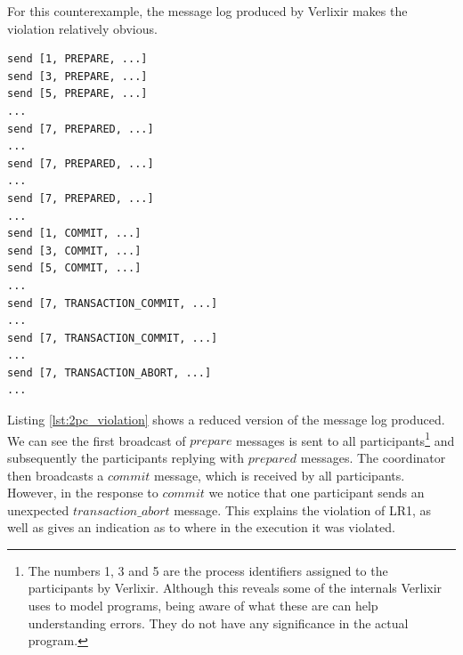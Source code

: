\par
For this counterexample, the message log produced by Verlixir makes the violation relatively obvious.
\begin{lstlisting}[xleftmargin=.01\linewidth, xrightmargin=0.01\linewidth, caption={Message log produced by counterexample violating LR1.}, label={lst:2pc_violation}]
send [1, PREPARE, ...]
send [3, PREPARE, ...]
send [5, PREPARE, ...]
...
send [7, PREPARED, ...]
...
send [7, PREPARED, ...]
...
send [7, PREPARED, ...]
...
send [1, COMMIT, ...]
send [3, COMMIT, ...]
send [5, COMMIT, ...]
...
send [7, TRANSACTION_COMMIT, ...]
...
send [7, TRANSACTION_COMMIT, ...]
...
send [7, TRANSACTION_ABORT, ...]
...
\end{lstlisting}
Listing \ref{lst:2pc_violation} shows a reduced version of the message log produced. We can see the first broadcast of $prepare$ messages is sent to all participants\footnote{The numbers 1, 3 and 5 are the process identifiers assigned to the participants by Verlixir. Although this reveals some of the internals Verlixir uses to model programs, being aware of what these are can help understanding errors. They do not have any significance in the actual program.} and subsequently the participants replying with $prepared$ messages. The coordinator then broadcasts a $commit$ message, which is received by all participants. However, in the response to $commit$ we notice that one participant sends an unexpected $transaction\_abort$ message. This explains the violation of LR1, as well as gives an indication as to where in the execution it was violated.
